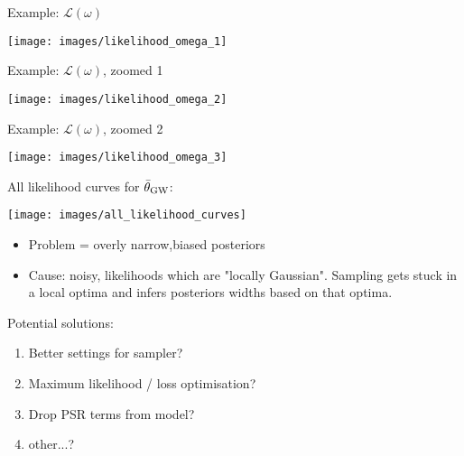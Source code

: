 \documentclass[10pt]{beamer}
\begin{document}
\begin{frame}{}
	
	Example: $\mathcal{L}(\omega)$
	
	\texttt{[image: images/likelihood\_omega\_1]}

	
\end{frame}


\begin{frame}{}
	
	Example: $\mathcal{L}(\omega)$, zoomed 1
	
	\texttt{[image: images/likelihood\_omega\_2]}
	
	
\end{frame}


\begin{frame}{}
	
	Example: $\mathcal{L}(\omega)$, zoomed 2
	
	\texttt{[image: images/likelihood\_omega\_3]}
	
	
\end{frame}


\begin{frame}{}
	
	All likelihood curves for $\bar{\theta}_{\rm GW}$:
	
	\texttt{[image: images/all\_likelihood\_curves]}
	
	
\end{frame}



\begin{frame}{}
	
		\begin{itemize}
		\item \alert{Problem} = overly narrow,biased posteriors
		\item Cause: noisy, likelihoods which are "locally Gaussian". Sampling gets stuck in a local optima and infers posteriors widths based on that optima. 
	\end{itemize}
	
	
	
\end{frame}


\begin{frame}{}
	Potential solutions:
	
	\begin{enumerate}
		\item Better settings for sampler?
		\item Maximum likelihood / loss optimisation? 
		\item Drop PSR terms from model?
		\item other...?
	\end{enumerate}
	
	
\end{frame}
\end{document}
